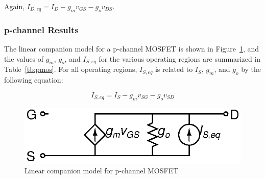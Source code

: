 \documentclass{article}
\begin{document}
Again, $I_{D,eq}=I_D-g_mv_{GS}-g_ov_{DS}$.

\pagebreak

\subsubsection{p-channel Results}

The linear companion model for a p-channel MOSFET is shown in Figure~\ref{fig:pmos}, and the values of $g_m$, $g_o$, and $I_{S,eq}$ for the various operating regions are summarized in Table~\ref{tb:pmos}.  For all operating regions, $I_{S,eq}$ is related to $I_S$, $g_m$, and $g_o$ by the following equation:

\begin{equation}
I_{S,eq} =  I_S - g_m v_{SG} - g_o v_{SD}
\end{equation}

\begin{figure}[h]
\begin{center}
\includegraphics{fig/pmos.eps}
\caption{Linear companion model for p-channel MOSFET \label{fig:pmos}}
\end{center}
\end{figure}

\begin{table}[h]
\caption{PMOS companion model parameters \label{tb:pmos}}
\end{table}
\end{document}
